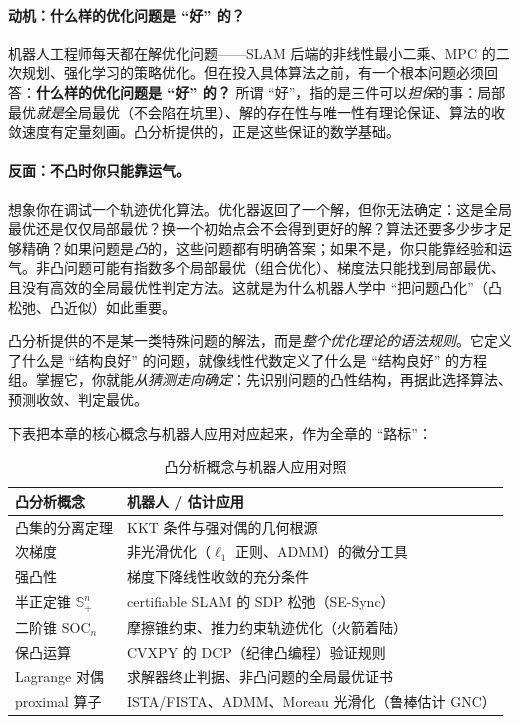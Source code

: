 \paragraph{动机：什么样的优化问题是 “好” 的？}
机器人工程师每天都在解优化问题——SLAM 后端的非线性最小二乘、MPC 的二次规划、强化学习的策略优化。但在投入具体算法之前，有一个根本问题必须回答：\textbf{什么样的优化问题是 “好” 的？} 所谓 “好”，指的是三件可以\emph{担保}的事：局部最优\emph{就是}全局最优（不会陷在坑里）、解的存在性与唯一性有理论保证、算法的收敛速度有定量刻画。凸分析提供的，正是这些保证的数学基础。

\paragraph{反面：不凸时你只能靠运气。}
想象你在调试一个轨迹优化算法。优化器返回了一个解，但你无法确定：这是全局最优还是仅仅局部最优？换一个初始点会不会得到更好的解？算法还要多少步才足够精确？如果问题是\emph{凸}的，这些问题都有明确答案；如果不是，你只能靠经验和运气。非凸问题可能有指数多个局部最优（组合优化）、梯度法只能找到局部最优、且没有高效的全局最优性判定方法。这就是为什么机器人学中 “把问题凸化”（凸松弛、凸近似）如此重要。

\begin{insight}[凸分析是优化的语法规则]\label{ins:cvx-grammar}
凸分析提供的不是某一类特殊问题的解法，而是\emph{整个优化理论的语法规则}。它定义了什么是 “结构良好” 的问题，就像线性代数定义了什么是 “结构良好” 的方程组。掌握它，你就能\emph{从猜测走向确定}：先识别问题的凸性结构，再据此选择算法、预测收敛、判定最优。
\end{insight}

\noindent 下表把本章的核心概念与机器人应用对应起来，作为全章的 “路标”：

\begin{table}[H]\centering\small
\caption{凸分析概念与机器人应用对照}
\label{tab:cvx-applications}
\begin{tabular}{ll}
\toprule
凸分析概念 & 机器人 / 估计应用 \\
\midrule
凸集的分离定理 & KKT 条件与强对偶的几何根源 \\
次梯度 & 非光滑优化（$\ell_1$ 正则、ADMM）的微分工具 \\
强凸性 & 梯度下降线性收敛的充分条件 \\
半正定锥 $\mathbb{S}^n_+$ & certifiable SLAM 的 SDP 松弛（SE-Sync） \\
二阶锥 $\mathrm{SOC}_n$ & 摩擦锥约束、推力约束轨迹优化（火箭着陆） \\
保凸运算 & CVXPY 的 DCP（纪律凸编程）验证规则 \\
Lagrange 对偶 & 求解器终止判据、非凸问题的全局最优证书 \\
proximal 算子 & ISTA/FISTA、ADMM、Moreau 光滑化（鲁棒估计 GNC） \\
\bottomrule
\end{tabular}
\end{table}

